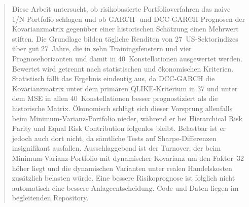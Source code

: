 \documentclass[a4paper, 12pt]{article}
\begin{document}

\setcounter{page}{1}

\renewcommand{\abstractname}{Abstrakt}
\begin{abstract}
Diese Arbeit untersucht, ob risikobasierte Portfolioverfahren das naive 1/N-Portfolio schlagen und ob GARCH- und DCC-GARCH-Prognosen der Kovarianzmatrix gegenüber einer historischen Schätzung einen Mehrwert stiften.
Die Grundlage bilden tägliche Renditen von 27~US-Sektorindizes über gut 27~Jahre, die in zehn Trainingsfenstern und vier Prognosehorizonten und damit in 40~Konstellationen ausgewertet werden.
Bewertet wird getrennt nach statistischen und ökonomischen Kriterien.
Statistisch fällt das Ergebnis eindeutig aus, da DCC-GARCH die Kovarianzmatrix unter dem primären QLIKE-Kriterium in 37 und unter dem MSE in allen 40~Konstellationen besser prognostiziert als die historische Matrix.
Ökonomisch schlägt sich dieser Vorsprung allenfalls beim Minimum-Varianz-Portfolio nieder, während er bei Hierarchical Risk Parity und Equal Risk Contribution folgenlos bleibt.
Belastbar ist er jedoch auch dort nicht, da sämtliche Tests auf Sharpe-Differenzen insignifikant ausfallen.
Ausschlaggebend ist der Turnover, der beim Minimum-Varianz-Portfolio mit dynamischer Kovarianz um den Faktor~32 höher liegt und die dynamischen Varianten unter realen Handelskosten zusätzlich belasten würde.
Eine bessere Risikoprognose ist folglich nicht automatisch eine bessere Anlageentscheidung.
Code und Daten liegen im begleitenden Repository.
\end{abstract}

\end{document}
